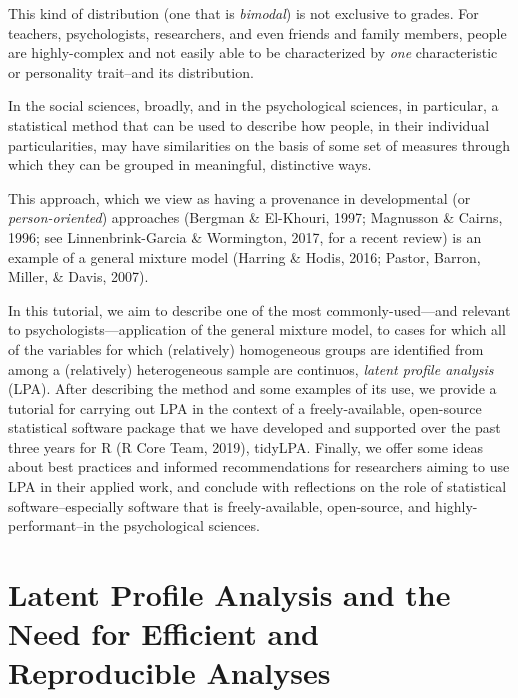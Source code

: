 \documentclass[man]{apa6}
\begin{document}
This kind of distribution (one that is \emph{bimodal}) is not exclusive to grades.
For teachers, psychologists, researchers, and even friends and family members,
people are highly-complex and not easily able to be characterized by \emph{one}
characteristic or personality trait--and its distribution.

In the social sciences, broadly, and in the psychological sciences, in
particular, a statistical method that can be used to describe how people, in
their individual particularities, may have similarities on the basis of some set
of measures through which they can be grouped in meaningful, distinctive ways.

This approach, which we view as having a provenance in developmental (or
\emph{person-oriented}) approaches (Bergman \& El-Khouri, 1997; Magnusson \&
Cairns, 1996; see Linnenbrink-Garcia \& Wormington, 2017, for a recent review) is
an example of a general mixture model (Harring \& Hodis, 2016; Pastor, Barron,
Miller, \& Davis, 2007).

In this tutorial, we aim to describe one of the most commonly-used---and
relevant to psychologists---application of the general mixture model, to cases
for which all of the variables for which (relatively) homogeneous groups are
identified from among a (relatively) heterogeneous sample are continuos, \emph{latent
profile analysis} (LPA). After describing the method and some examples of its
use, we provide a tutorial for carrying out LPA in the context of a
freely-available, open-source statistical software package that we have
developed and supported over the past three years for R (R Core Team, 2019),
tidyLPA. Finally, we offer some ideas about best practices and informed
recommendations for researchers aiming to use LPA in their applied work, and
conclude with reflections on the role of statistical software--especially
software that is freely-available, open-source, and highly-performant--in the
psychological sciences.

\hypertarget{latent-profile-analysis-and-the-need-for-efficient-and-reproducible-analyses}{%
\section{Latent Profile Analysis and the Need for Efficient and Reproducible Analyses}\label{latent-profile-analysis-and-the-need-for-efficient-and-reproducible-analyses}}
\end{document}

